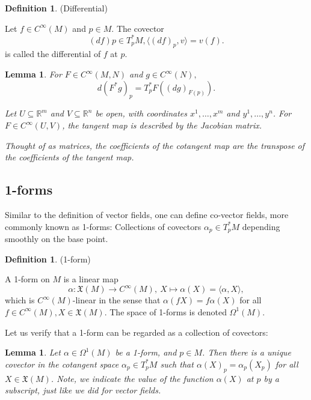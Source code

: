 \documentclass{article}
\newtheorem{lemma}[theorem]{Lemma}
\theoremstyle{definition}
\newtheorem{defn}[theorem]{Definition}
\newenvironment{definition}
  {\vspace{8pt}\begin{mdframed}[backgroundcolor=blueish,innertopmargin=4]\begin{defn}}
  {\end{defn}\end{mdframed}\vspace{4pt}}
\begin{document}
\begin{definition} (Differential)

Let $f \in C^\infty(M)$ and $p \in M$. The covector 
\[
    (d f)p \in T^*_p M,  \langle (d f)_p, v\rangle = v(f).
\]
is called the differential of $f$ at $p$.

\end{definition}

\begin{lemma}
For $F \in C^\infty(M,N)$ and $g \in C^\infty(N),$
\[
    d(F^* g)_p = T^*_p F((dg)_{F(p)}).
\]

Let $U \subseteq \mathbb R^m$ and $V \subseteq \mathbb R^n$ be open, with coordinates $x^1 , \dots , x^m$ and $y^1,\dots, y^n$. For $F \in C^\infty(U,V)$, the tangent map is described by the Jacobian matrix.

Thought of as matrices, the coefficients of the cotangent map are the transpose of the coefficients of the tangent map.
\end{lemma}

\subsection{1-forms}

Similar to the definition of vector fields, one can define co-vector fields, more commonly known as 1-forms: Collections of covectors $\alpha_p \in T^*_p M$ depending smoothly on the base point. 

\begin{definition} (1-form)

A 1-form on $M$ is a linear map 
\[
    \alpha : \mathfrak X(M) \rightarrow C^\infty (M), \  X \mapsto \alpha(X) = \langle \alpha, X \rangle,
\]
which is $C^\infty(M)$-linear in the sense that $\alpha(f X) = f\alpha(X)$ for all $f \in C^\infty(M), X \in \mathfrak X(M)$. The space of 1-forms is denoted $\Omega^1 (M)$.

\end{definition}

Let us verify that a 1-form can be regarded as a collection of covectors:

\begin{lemma}
Let $\alpha \in \Omega^1 (M)$ be a 1-form, and $p \in M$. Then there is a unique covector in the cotangent space $\alpha_p \in T^*_p M$ such that $\alpha(X)_p = \alpha_p(X_p)$ for all $X \in \mathfrak X(M)$. Note, we indicate the value of the function $\alpha(X)$ at $p$ by a subscript, just like we did for
vector fields.
\end{lemma}
\end{document}
